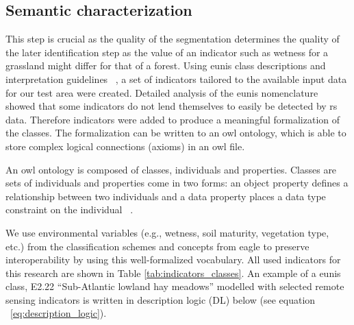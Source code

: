 \documentclass[authoryear,review,12pt,number]{elsarticle}
\begin{document}
\subsection{Semantic characterization}
\label{subsec:reference_data_and_semantic_characterisation} 
 This step is
crucial as the quality of the segmentation determines the quality of the later
identification step as the value of an indicator such as wetness for a grassland
might differ for that of a forest. %
Using \gls{eunis} class descriptions and
interpretation guidelines ~\citep{EUNISManual}, a set of indicators 
tailored to the available input data for our test area were created. Detailed
analysis of the \gls{eunis} nomenclature showed that some indicators do not lend themselves 
to easily be detected by \gls{rs} data. Therefore 
indicators were added to produce a meaningful formalization of the classes. The
formalization can be written to an \gls{owl} ontology, which is able to store 
complex logical connections (axioms) in an \gls{owl} file.

An \gls{owl} ontology is composed of classes, individuals and 
properties. Classes are
sets of individuals and properties come in two forms: an object property defines
a relationship between two individuals and a data property  places a data type
constraint on the individual ~\citep{OWL2}. 

We use environmental variables (e.g., wetness, soil maturity, vegetation type,
etc.) from the classification schemes and concepts from \gls{eagle} to preserve
interoperability by using this well-formalized vocabulary. All used indicators
for this research are shown in Table \ref{tab:indicators_classes}. An example of
a \gls{eunis} class, E2.22 ``Sub-Atlantic lowland hay meadows'' modelled with 
selected
remote sensing indicators is written in description logic (DL) below (see
equation ~\ref{eq:description_logic}).
\end{document}
